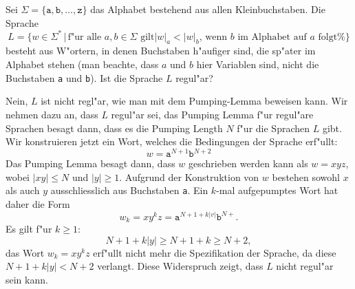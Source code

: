 Sei $\Sigma=\{\texttt{a},\texttt{b},\dots,\texttt{z}\}$ das Alphabet
bestehend aus allen Kleinbuchstaben. Die Sprache
\[
L=\{ w\in\Sigma^*
\,
|\,
\text{
f"ur alle $a,b\in\Sigma$ gilt
$|w|_a < |w|_b$, wenn $b$ im Alphabet auf $a$ folgt%
}
\}
\]
besteht aus W"ortern, in denen Buchstaben h"aufiger sind, die sp"ater im
Alphabet stehen (man beachte, dass $a$ und $b$ hier Variablen sind,
nicht die Buchstaben \texttt{a} und \texttt{b}). Ist die Sprache $L$ regul"ar?

\begin{loesung}
Nein, $L$ ist nicht regl"ar, wie man mit dem Pumping-Lemma beweisen kann.
Wir nehmen dazu an, dass $L$ regul"ar sei, das Pumping Lemma f"ur
regul"are Sprachen besagt dann, dass es die Pumping Length $N$ f"ur die
Sprachen $L$ gibt.
Wir konstruieren jetzt ein Wort, welches die Bedingungen der Sprache
erf"ullt:
\[
w=\texttt{a}^{N+1}\texttt{b}^{N+2}
\]
Das Pumping Lemma besagt dann, dass $w$ geschrieben werden kann als
$w=xyz$, wobei $|xy|\le N$ und $|y|\ge 1$. 
Aufgrund der Konstruktion von $w$ bestehen sowohl $x$ als auch $y$
ausschliesslich aus Buchstaben \texttt{a}.
Ein $k$-mal aufgepumptes Wort hat daher die Form
\[
w_k=xy^kz = \texttt{a}^{N+1+k|v|}\texttt{b}^{N+}.
\]
Es gilt f"ur $k\ge 1$:
\[
N+1+k|y|\ge N+1+k\ge N+2,
\]
das Wort $w_k=xy^kz$ erf"ullt nicht mehr die Spezifikation der Sprache,
da diese $N+1+k|y| < N+2$ verlangt.
Diese Widerspruch zeigt, dass $L$ nicht regul"ar sein kann.
\end{loesung}

